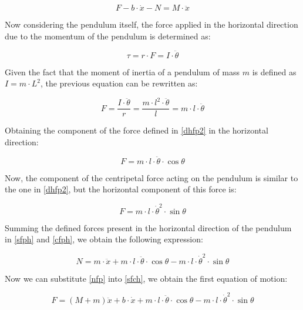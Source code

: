 \documentclass{article}
\begin{document}
\begin{equation} \label{sfch}
F-b\cdot \dot{x}-N=M\cdot \ddot{x}
\end{equation}

Now considering the pendulum itself, the force applied in the horizontal direction due to the momentum of the pendulum is determined as:

\begin{equation} \label{dhfp}
\tau=r\cdot F=I\cdot \ddot{\theta}
\end{equation}

Given the fact that the moment of inertia of a pendulum of mass $m$ is defined as $I=m\cdot L^2$, the previous equation can be rewritten as:

\begin{equation} \label{dhfp2}
F=\frac{I\cdot \ddot{\theta}}{r}=\frac{m\cdot l^2\cdot \ddot{\theta}}{l}=m\cdot l\cdot \ddot{\theta}
\end{equation}

Obtaining the component of the force defined in \ref{dhfp2} in the horizontal direction:

\begin{equation} \label{sfph}
F=m\cdot l\cdot \ddot{\theta}\cdot \cos{\theta}
\end{equation}

Now, the component of the centripetal force acting on the pendulum is similar to the one in \ref{dhfp2}, but the horizontal component of this force is:

\begin{equation} \label{cfph}
F=m\cdot l\cdot \dot{\theta}^2\cdot \sin{\theta}
\end{equation}

Summing the defined forces present in the horizontal direction of the pendulum in \ref{sfph} and \ref{cfph}, we obtain the following expression:

\begin{equation} \label{nfp}
N=m\cdot \ddot{x}+m\cdot l\cdot \ddot{\theta}\cdot \cos{\theta}-m\cdot l\cdot \dot{\theta}^2\cdot \sin{\theta}
\end{equation}

Now we can substitute \ref{nfp} into \ref{sfch}, we obtain the first equation of motion:

\begin{equation} \label{fem}
F=(M+m)\ddot{x}+b\cdot \dot{x}+m\cdot l\cdot \ddot{\theta}\cdot \cos{\theta}-m\cdot l\cdot \dot{\theta}^2\cdot \sin{\theta}
\end{equation}
\end{document}
